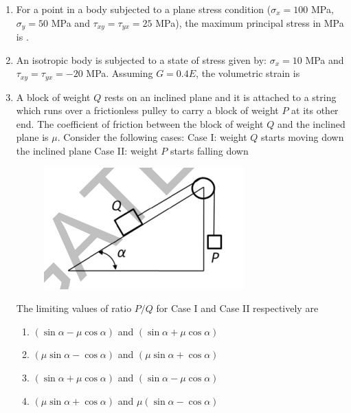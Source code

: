 \documentclass[a4paper,10pt]{article}
\begin{document}
\begin{enumerate}
    \item For a point in a body subjected to a plane stress condition ($\sigma_x = 100$ MPa, $\sigma_y = 50$ MPa and $\tau_{xy} = \tau_{yx} = 25$ MPa), the maximum principal stress in MPa is \underline{\hspace{2cm}}.
    
    \hfill{}
    
    \item An isotropic body is subjected to a state of stress given by: $\sigma_x = 10$ MPa and $\tau_{xy} = \tau_{yx} = -20$ MPa. Assuming $G=0.4E$, the volumetric strain is
    
    \hfill{}
    \begin{enumerate}
    \end{enumerate}
    
    \item A block of weight $Q$ rests on an inclined plane and it is attached to a string which runs over a frictionless pulley to carry a block of weight $P$ at its other end. The coefficient of friction between the block of weight $Q$ and the inclined plane is $\mu$. Consider the following cases:
    Case I: weight $Q$ starts moving down the inclined plane
    Case II: weight $P$ starts falling down
    \begin{figure}[H] \centering \includegraphics[width=0.4\columnwidth]{q19_solid.png} \caption*{} \label{fig:q19_solid} \end{figure}
    The limiting values of ratio $P/Q$ for Case I and Case II respectively are
    
    \hfill{}
    \begin{enumerate}
        \item $(\sin\alpha - \mu\cos\alpha)$ and $(\sin\alpha + \mu\cos\alpha)$
        \item $(\mu\sin\alpha - \cos\alpha)$ and $(\mu\sin\alpha + \cos\alpha)$
        \item $(\sin\alpha + \mu\cos\alpha)$ and $(\sin\alpha - \mu\cos\alpha)$
        \item $(\mu\sin\alpha + \cos\alpha)$ and $\mu(\sin\alpha - \cos\alpha)$
    \end{enumerate}
    

\end{enumerate}
\end{document}
